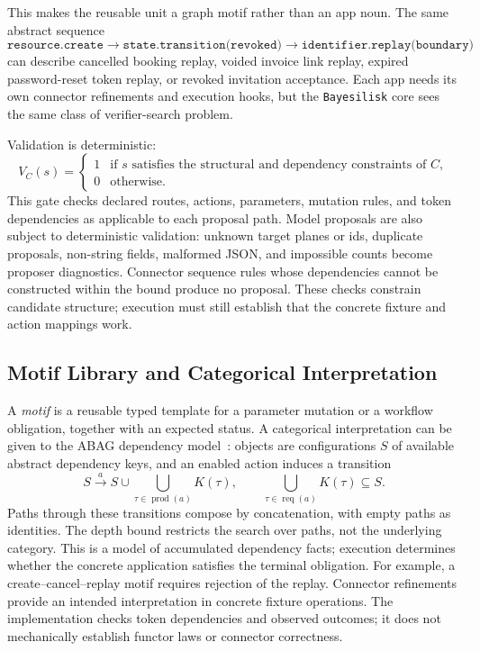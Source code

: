 \documentclass[10pt]{article}
\newcommand{\tool}{\texttt{Bayesilisk}\xspace}
\begin{document}
This makes the reusable unit a graph motif rather than an app noun. The same
abstract sequence
\[
  \texttt{resource.create}
  \rightarrow
  \texttt{state.transition(revoked)}
  \rightarrow
  \texttt{identifier.replay(boundary)}
\]
can describe cancelled booking replay, voided invoice link replay, expired
password-reset token replay, or revoked invitation acceptance. Each app needs
its own connector refinements and execution hooks, but the \tool core sees the
same class of verifier-search problem.

Validation is deterministic:
\[
  V_C(s) =
  \begin{cases}
    1 & \text{if } s \text{ satisfies the structural and dependency constraints of } C,\\
    0 & \text{otherwise.}
  \end{cases}
\]
This gate checks declared routes, actions, parameters, mutation rules, and
token dependencies as applicable to each proposal path. Model proposals are
also subject to deterministic validation: unknown target planes or ids,
duplicate proposals, non-string fields, malformed JSON, and impossible counts
become proposer diagnostics. Connector sequence rules whose dependencies cannot
be constructed within the bound produce no proposal. These checks constrain
candidate structure; execution must still establish that the concrete fixture
and action mappings work.

\subsection{Motif Library and Categorical Interpretation}

A \emph{motif} is a reusable typed template for a parameter mutation or a
workflow obligation, together with an expected status. A categorical
interpretation can be given to the ABAG dependency model~\cite{maclane}: objects
are configurations \(S\) of available abstract dependency keys, and an enabled
action induces a transition
\[
  S \xrightarrow{a}
  S \cup \bigcup_{\tau\in\operatorname{prod}(a)} K(\tau),
  \qquad
  \bigcup_{\tau\in\operatorname{req}(a)} K(\tau) \subseteq S.
\]
Paths through these transitions compose by concatenation, with empty paths as
identities. The depth bound restricts the search over paths, not the underlying
category. This is a model of accumulated dependency facts; execution determines
whether the concrete application satisfies the terminal obligation. For
example, a create--cancel--replay motif requires rejection of the replay.
Connector refinements provide an intended interpretation in concrete fixture
operations. The implementation checks token dependencies and observed
outcomes; it does not mechanically establish functor laws or connector
correctness.
\end{document}
